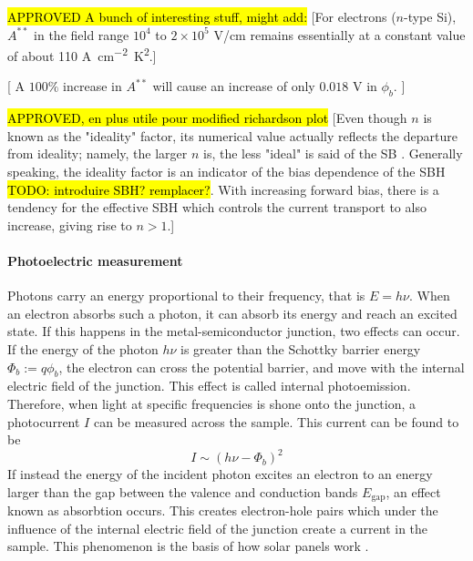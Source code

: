 
\hl{APPROVED A bunch of interesting stuff, might add:}
[For electrons ($n$-type Si), $A^{**}$ in the field range $10^4$ to $2\times 10^5$ V/cm remains essentially at a constant value of about 110 \unit{A cm^{-2} K^2}.]

[ A $100 \%$ increase in $A^{**}$ will cause an increase of only $0.018$ V in $\phi_b$. ]


\hl{APPROVED, en plus utile pour modified richardson plot} [Even though $n$ is known as the  "ideality" factor, its numerical value actually reflects the departure from ideality; namely, the larger $n$ is, the less "ideal" is said of the SB \cite{tung_recent_2001}.
Generally speaking, the ideality factor is an indicator of the bias dependence of the SBH \hl{TODO: introduire SBH? remplacer?}. With increasing forward bias, there is a tendency for the effective SBH which controls the current transport to also increase, giving rise to $n > 1$.]


\paragraph{Photoelectric measurement}
Photons carry an energy proportional to their frequency, that is $E = h \nu$.
When an electron absorbs such a photon, it can absorb its energy and reach an excited state.
If this happens in the metal-semiconductor junction, two effects can occur.
If the energy of the photon $h\nu$ is greater than the Schottky barrier energy $\Phi_b := q\phi_b$, the electron can cross the potential barrier, and move with the internal electric field of the junction.
This effect is called internal photoemission.
Therefore, when light at specific frequencies is shone onto the junction, a photocurrent $I$ can be measured across the sample.
This current can be found to be \cite{notice}
\begin{equation}
    I \sim (h \nu - \Phi_b)^2
    \label{eq:fowler}
\end{equation}
If instead the energy of the incident photon excites an electron to an energy larger than the gap between the valence and conduction bands $E_\textrm{gap}$, an effect known as absorbtion occurs.
This creates electron-hole pairs which under the influence of the internal electric field of the junction create a current in the sample.
This phenomenon is the basis of how solar panels work \cite{notice}.

